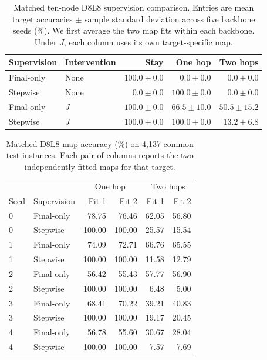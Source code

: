 \documentclass{article}
\begin{document}
\begin{table}[!htb]
\centering
\caption{Matched ten-node D8L8 supervision comparison. Entries are mean target accuracies $\pm$ sample standard deviation across five backbone seeds (\%). We first average the two map fits within each backbone. Under $J$, each column uses its own target-specific map.}
\label{tab:matched-supervision}
\begin{tabular}{@{}llrrr@{}}\toprule
Supervision & Intervention & Stay & One hop & Two hops\\\midrule
Final-only & None & $100.0\pm0.0$ & $0.0\pm0.0$ & $0.0\pm0.0$\\
Stepwise & None & $0.0\pm0.0$ & $100.0\pm0.0$ & $0.0\pm0.0$\\
Final-only & $J$ & $100.0\pm0.0$ & $66.5\pm10.0$ & $50.5\pm15.2$\\
Stepwise & $J$ & $100.0\pm0.0$ & $100.0\pm0.0$ & $13.2\pm6.8$\\
\bottomrule\end{tabular}
\end{table}

\begin{table}[!htb]
\centering
\caption{Matched D8L8 map accuracy (\%) on 4,137 common test instances. Each pair of columns reports the two independently fitted maps for that target.}
\label{tab:matched-fits}
\begin{tabular}{@{}llrrrr@{}}\toprule
 & & \multicolumn{2}{c}{One hop} & \multicolumn{2}{c}{Two hops}\\
Seed & Supervision & Fit 1 & Fit 2 & Fit 1 & Fit 2\\\midrule
0 & Final-only & 78.75 & 76.46 & 62.05 & 56.80\\
0 & Stepwise & 100.00 & 100.00 & 25.57 & 15.54\\
1 & Final-only & 74.09 & 72.71 & 66.76 & 65.55\\
1 & Stepwise & 100.00 & 100.00 & 11.58 & 12.79\\
2 & Final-only & 56.42 & 55.43 & 57.77 & 56.90\\
2 & Stepwise & 100.00 & 100.00 & 6.48 & 5.00\\
3 & Final-only & 68.41 & 70.22 & 39.21 & 40.83\\
3 & Stepwise & 100.00 & 100.00 & 19.17 & 20.45\\
4 & Final-only & 56.78 & 55.60 & 30.67 & 28.04\\
4 & Stepwise & 100.00 & 100.00 & 7.57 & 7.69\\
\bottomrule\end{tabular}
\end{table}
\end{document}
